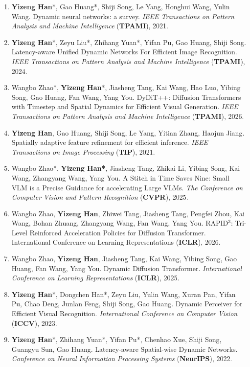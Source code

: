 \documentclass[10.5pt, UTF8]{ctexart}
\makeatletter
\newlength{\bibhang}
\newlength{\bibsep}
 {\@listi \global\bibsep\itemsep \global\advance\bibsep by\parsep}
\newenvironment{bibsection}%
        {\begin{enumerate}{%
       \setlength{\leftmargin}{-2em}%
       \setlength{\itemindent}{-2em}%
       \setlength{\itemsep}{\bibsep}%
        \setlength{\partopsep}{0pt}%
        \setlength{\topsep}{0pt}}}
        {\end{enumerate}\vspace{-.6\baselineskip}}
\makeatother
\begin{document}
\begin{sloppypar}
\begin{bibsection}
        \item \textbf{Yizeng Han}*, {Gao Huang*}, Shiji Song, Le Yang, Honghui Wang, Yulin Wang. Dynamic neural networks: a survey. \emph{IEEE Transactions on Pattern Analysis and Machine Intelligence} (\textbf{TPAMI}), 2021.
        \item \textbf{Yizeng Han}*, Zeyu Liu*, Zhihang Yuan*, Yifan Pu, Gao Huang, Shiji Song. Latency-aware Unified Dynamic Networks For Efficient Image Recognition. \emph{IEEE Transactions on Pattern Analysis and Machine Intelligence} (\textbf{TPAMI}), 2024.
        \item Wangbo Zhao*, \textbf{Yizeng Han}*, Jiasheng Tang, Kai Wang, Hao Luo, Yibing Song, Gao Huang, Fan Wang, Yang You. DyDiT++: Diffusion Transformers with Timestep and Spatial Dynamics for Efficient Visual Generation. \emph{IEEE Transactions on Pattern Analysis and Machine Intelligence} (\textbf{TPAMI}), 2026.
        \item \textbf{Yizeng Han}, {Gao Huang}, Shiji Song, Le Yang, Yitian Zhang, Haojun Jiang. Spatially adaptive feature refinement for efficient inference. \emph{IEEE Transactions on Image Processing} (\textbf{TIP}), 2021.
        \item Wangbo Zhao*, \textbf{Yizeng Han*}, Jiasheng Tang, Zhikai Li, Yibing Song, Kai Wang, Zhangyang Wang, Yang You. A Stitch in Time Saves Nine: Small VLM is a Precise Guidance for accelerating Large VLMs. \emph{The Conference on Computer Vision and Pattern Recognition} (\textbf{CVPR}), 2025.
        \item Wangbo Zhao, \textbf{Yizeng Han}, Zhiwei Tang, Jiasheng Tang, Pengfei Zhou, Kai Wang, Bohan Zhuang, Zhangyang Wang, Fan Wang, Yang You. RAPID$^3$: Tri-Level Reinforced Acceleration Policies for Diffusion Transformer. {International Conference on Learning Representations} (\textbf{ICLR}), 2026.
        \item Wangbo Zhao, \textbf{Yizeng Han}, Jiasheng Tang, Kai Wang, Yibing Song, Gao Huang, Fan Wang, Yang You. Dynamic Diffusion Transformer. \emph{International Conference on Learning Representations} (\textbf{ICLR}), 2025.
        \item \textbf{Yizeng Han}*, Dongchen Han*, Zeyu Liu, Yulin Wang, Xuran Pan, Yifan Pu, Chao Deng, Junlan Feng, Shiji Song, Gao Huang. Dynamic Perceiver for Efficient Visual Recognition. \emph{International Conference on Computer Vision} (\textbf{ICCV}), 2023.
        \item \textbf{Yizeng Han}*, {Zhihang Yuan*}, {Yifan Pu*}, Chenhao Xue, Shiji Song, Guangyu Sun, Gao Huang. Latency-aware Spatial-wise Dynamic Networks. \emph{Conference on Neural Information Processing Systems} (\textbf{NeurIPS}), 2022.

\end{bibsection}
\end{sloppypar}
\end{document}
